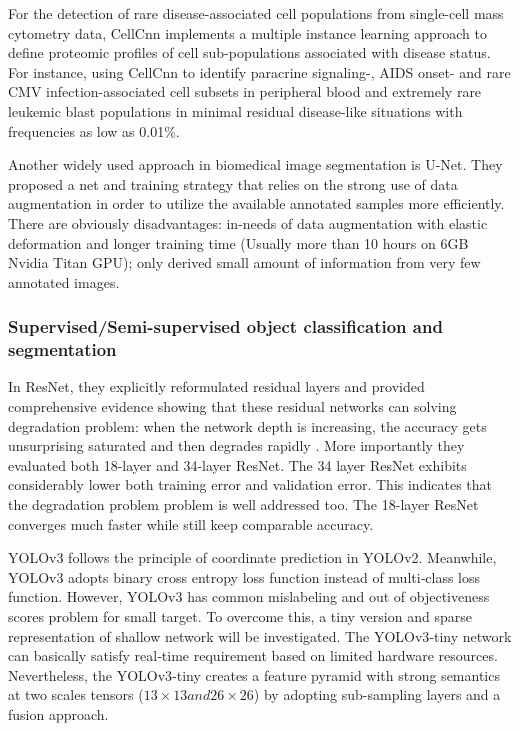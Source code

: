 For the detection of rare disease-associated cell populations from single-cell mass cytometry data, CellCnn \cite{3} implements a multiple instance learning approach to define proteomic profiles of cell sub-populations associated with disease status. For instance, using CellCnn to identify paracrine signaling-, AIDS onset- and rare CMV infection-associated cell subsets in peripheral blood and extremely rare leukemic blast populations in minimal residual disease-like situations with frequencies as low as 0.01\%\cite{3}.

Another widely used approach in biomedical image segmentation is U-Net\cite{14}. They proposed a net and training strategy that relies on the strong use of data augmentation in order to utilize the available annotated samples more efficiently\cite{14}.
There are obviously disadvantages: in-needs of data augmentation with elastic deformation and longer training time (Usually more than 10 hours on 6GB Nvidia Titan GPU); only derived small amount of information from very few annotated images\cite{14}.

\subsubsection{Supervised/Semi-supervised object classification and segmentation}
In ResNet\cite{20}, they explicitly reformulated residual layers and provided comprehensive evidence showing that these residual networks can solving degradation problem: when the network depth is increasing, the accuracy gets unsurprising saturated and then degrades rapidly \cite{20}.
More importantly they evaluated both 18-layer and 34-layer ResNet. The 34 layer ResNet exhibits considerably lower both training error and validation error. This indicates that the degradation problem problem is well addressed too. The 18-layer ResNet\cite{20} converges much faster while still keep comparable accuracy. 

YOLOv3 \cite{33} follows the principle of coordinate prediction in YOLOv2. 
Meanwhile, YOLOv3 adopts binary cross entropy loss function instead of multi‐class loss function\cite{18}. However, YOLOv3 has common mislabeling and out of objectiveness scores problem for small target. To overcome this, a tiny version and sparse representation of shallow network will be investigated. The YOLOv3‐tiny network can basically satisfy real‐time requirement based on limited hardware resources. Nevertheless, the YOLOv3‐tiny creates a feature pyramid with strong semantics at two scales tensors ($13 \times 13 and 26 \times 26$) by adopting sub-sampling layers and a fusion approach\cite{18}.


